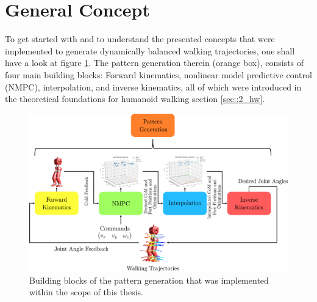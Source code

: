 
\FloatBarrier
\section{General Concept}
\label{sec::61_gc}
To get started with and to understand the presented concepts that were implemented to generate dynamically balanced walking trajectories, one shall have a look at figure \ref{fig::61_pg}. The pattern generation therein (orange box), consists of four main building blocks: Forward kinematics, nonlinear model predictive control (NMPC), interpolation, and inverse kinematics, all of which were introduced in the theoretical foundations for humanoid walking section \ref{sec::2_hw}.
\begin{figure}[h!]
	\centering
	\includegraphics[scale=.5]{chapters/06_implementation_of_the_walking_pattern_generator/img/pattern_generation.png}
	\caption{Building blocks of the pattern generation that was implemented within the scope of this thesis.}
	\label{fig::61_pg}
\end{figure}
